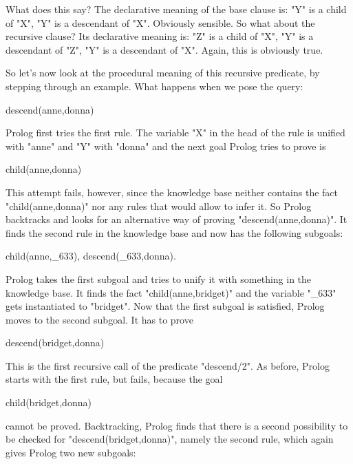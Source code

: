 What does this say?  The declarative meaning of the base clause
is:  "Y" is a child of "X",  "Y" is a
descendant of "X". Obviously sensible.
So what about the recursive clause?  Its declarative meaning is:
 "Z" is a child of "X",  "Y" is a
descendant of "Z",  "Y" is a descendant of
"X". Again, this is obviously true.

So let's now look at the procedural meaning of this recursive
predicate, by stepping through an example. What happens when we pose
the query:
\begin{LPNcodedisplay}
descend(anne,donna)
\end{LPNcodedisplay}
Prolog first tries the first rule. The variable "X" in the head
of the rule is unified with "anne" and "Y" with "donna"  and
the next goal Prolog tries to prove is

\begin{LPNcodedisplay}
child(anne,donna)
\end{LPNcodedisplay}


This attempt fails, however, since the knowledge base
neither contains the fact "child(anne,donna)" nor any rules
that would allow to infer it.
So Prolog backtracks and looks for an alternative way of proving
"descend(anne,donna)". It finds the second rule in the
knowledge base and now has the following subgoals:

\begin{LPNcodedisplay}
child(anne,_633),
descend(_633,donna).
\end{LPNcodedisplay}


Prolog takes the first subgoal and tries to unify  it with something in
the knowledge base. It finds the fact "child(anne,bridget)"
and the variable "\_633" gets instantiated to "bridget".
Now that the first subgoal is satisfied, Prolog moves to the
second subgoal. It has to prove

\begin{LPNcodedisplay}
descend(bridget,donna)
\end{LPNcodedisplay}


This is the first recursive call of the predicate "descend/2". As
before, Prolog starts with the first rule, but fails, because the goal

\begin{LPNcodedisplay}
child(bridget,donna)
\end{LPNcodedisplay}
cannot be proved. Backtracking, Prolog finds that there is a second
possibility to be checked for "descend(bridget,donna)", namely the
second rule, which again gives Prolog two new subgoals:

